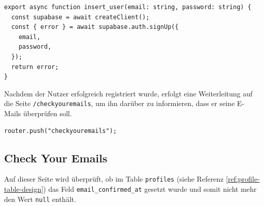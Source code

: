 \begin{inhalt}
\begin{lstlisting}[style=mytsx]
export async function insert_user(email: string, password: string) {
  const supabase = await createClient();
  const { error } = await supabase.auth.signUp({
    email,
    password,
  });
  return error;
}
\end{lstlisting}

Nachdem der Nutzer erfolgreich registriert wurde, erfolgt eine Weiterleitung auf die Seite \texttt{/checkyouremails}, um ihn darüber zu informieren, dass er seine E-Mails überprüfen soll.

\begin{lstlisting}[style=mytsx]
      router.push("checkyouremails");
\end{lstlisting}

\subsection{Check Your Emails}

Auf dieser Seite wird überprüft, ob im Table \texttt{profiles} (siehe Referenz \ref{ref:profile-table-design}) das Feld \texttt{email\_confirmed\_at} gesetzt wurde und somit nicht mehr den Wert \texttt{null} enthält.  




\end{inhalt}
